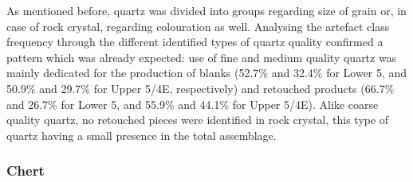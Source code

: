 \documentclass[12pt,twoside]{reedthesis}
\begin{document}
As mentioned before, quartz was divided into groups regarding size of grain or, in case of rock crystal, regarding colouration as well. Analysing the artefact class frequency through the different identified types of quartz quality confirmed a pattern which was already expected: use of fine and medium quality quartz was mainly dedicated for the production of blanks (52.7\% and 32.4\% for Lower 5, and 50.9\% and 29.7\% for Upper 5/4E, respectively) and retouched products (66.7\% and 26.7\% for Lower 5, and 55.9\% and 44.1\% for Upper 5/4E). Alike coarse quality quartz, no retouched pieces were identified in rock crystal, this type of quartz having a small presence in the total assemblage.
\begin{table}[!h]

\caption{\label{tab:quartzquality1}Quartz quality by class (Lower 5).}
\centering
{}
\end{table}
\begin{table}[!h]

\caption{\label{tab:quartzquality2}Quartz quality by class (Upper 5/4E).}
\centering
{}
\end{table}
\hypertarget{chert}{%
\subsubsection{Chert}\label{chert}}
\end{document}
